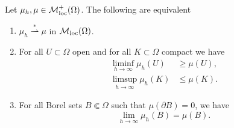 \begin{theorem}
Let $\mu_h, \mu \in \mathcal{M}^{+}_{\rm loc}(\Omega)$. The following are equivalent
\begin{enumerate}[(1)]
\item $\mu_h \stackrel {*}{\rightharpoonup} \mu$ in $\mathcal{M}_{\rm loc}(\Omega)$. 
\item For all $U \subset \Omega$ open and for all $K \subset \Omega$ compact we have 
\begin{align} \label{eq:liminf_ineq_open}
\liminf _{h\to \infty} \mu_h(U) & \geq \mu(U), \\
\limsup_{h \to \infty} \mu_h(K) & \leq \mu(K). \label{eq:limsup_ineq_compact}
\end{align} 
\item For all Borel sets $B\Subset \Omega$ such that $\mu(\partial B) = 0$, we
have 
\begin{equation} \label{eq:limit_Borel_no_boundary} 
\lim_{h\to \infty} \mu_h(B) = \mu(B).
\end{equation}
\end{enumerate}
\end{theorem}
